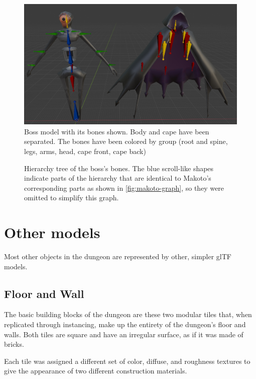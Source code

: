 \begin{figure}[H]
    \centering
    \includegraphics[width=1\textwidth]{images/ch3/Phantom-Bones.png}
    \caption{Boss model with its bones shown. Body and cape have been separated. The bones have been colored by group (root and spine, legs, arms, head, cape front, cape back)}
    \label{fig:phantom-bones}
\end{figure}

\begin{figure}[H]
    \centering
    
    \caption{Hierarchy tree of the boss's bones. The blue scroll-like shapes indicate parts of the hierarchy that are identical to Makoto's corresponding parts as shown in \autoref{fig:makoto-graph}, so they were omitted to simplify this graph.}
    \label{fig:phantom-graph}
\end{figure}

\newpage

\section{Other models}

Most other objects in the dungeon are represented by other, simpler glTF models.

\subsection{Floor and Wall}

The basic building blocks of the dungeon are these two modular tiles that, when replicated through instancing, make up the entirety of the dungeon's floor and walls. Both tiles are square and have an irregular surface, as if it was made of bricks.

Each tile was assigned a different set of color, diffuse, and roughness textures to give the appearance of two different construction materials.

